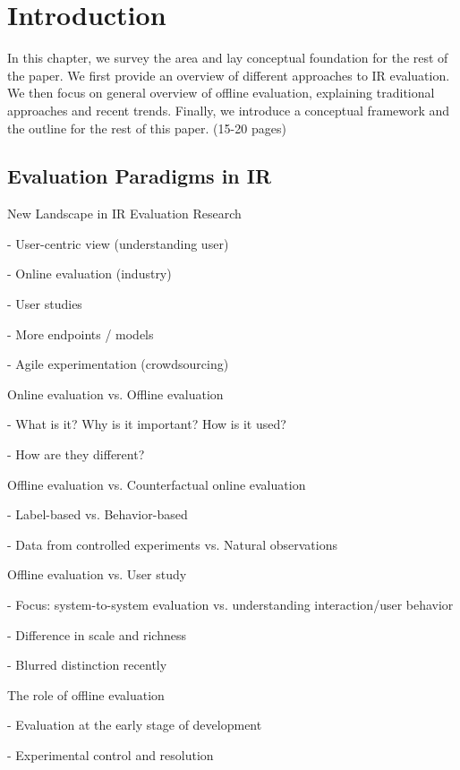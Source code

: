 \documentclass[openany]{now} %
\newcommand{\newpar}{\bigskip\noindent}
\begin{document}
\chapter{Introduction}
\label{c-intro}

In this chapter, we survey the area and lay conceptual foundation for the rest of the paper. We first provide an overview of different approaches to IR evaluation. We then focus on general overview of offline evaluation, explaining traditional approaches and recent trends. Finally, we introduce a conceptual framework and the outline for the rest of this paper. (15-20 pages)

\section{Evaluation Paradigms in IR}

\newpar
New Landscape in IR Evaluation Research

- User-centric view (understanding user)

- Online evaluation (industry)

- User studies

- More endpoints / models

- Agile experimentation (crowdsourcing)

\newpar
Online evaluation \cite{INR-XYZ} vs. Offline evaluation \cite{INR-009} 

- What is it? Why is it important? How is it used?

- How are they different?

\newpar
Offline evaluation vs. Counterfactual online evaluation \cite{chuklin2015click} \cite{Li:2015, li2010contextual}

- Label-based vs. Behavior-based

- Data from controlled experiments vs. Natural observations

\newpar
Offline evaluation vs. User study \cite{kelly2009methods}

- Focus: system-to-system evaluation vs. understanding interaction/user behavior

- Difference in scale and richness

- Blurred distinction recently
\cite{Bron:2013}
\cite{Liu:2014}
\cite{Shah:2011}

\newpar
The role of offline evaluation

- Evaluation at the early stage of development

- Experimental control and resolution
\end{document}
